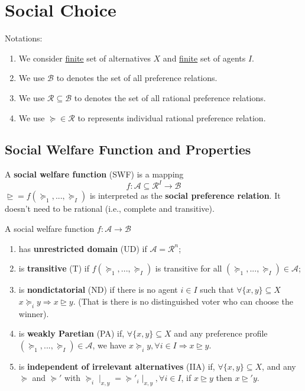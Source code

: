 \documentclass[11pt]{elegantbook}
\begin{document}
\section{Social Choice}
Notations:
\begin{enumerate}
    \item We consider \underline{finite} set of alternatives $X$ and \underline{finite} set of agents $I$.
    \item We use $\mathcal{B}$ to denotes the set of all preference relations.
    \item We use $\mathcal{R}\subseteq \mathcal{B}$ to denotes the set of all rational preference relations.
    \item We use $\succeq\in \mathcal{R}$ to represents individual rational preference relation.
\end{enumerate}

\subsection{Social Welfare Function and Properties}
\begin{definition}
    \normalfont
    A \textbf{social welfare function} (SWF) is a mapping $$f: \mathcal{A}\subseteq \mathcal{R}^I\rightarrow \mathcal{B}$$
    $\trianglerighteq=f(\succeq_1,...,\succeq_I)$ is interpreted as the \textbf{social preference relation}. It doesn't need to be rational (i.e., complete and transitive).
\end{definition}

\begin{definition}\label{SWF_properties}
    \normalfont
    A social welfare function $f: \mathcal{A}\rightarrow \mathcal{B}$
    \begin{enumerate}[$\circ$]
        \item has \textbf{unrestricted domain} (UD) if $\mathcal{A}=\mathcal{R}^n$;
        \item is \textbf{transitive} (T) if $f(\succeq_1,...,\succeq_I)$ is transitive for all $(\succeq_1,...,\succeq_I)\in \mathcal{A}$;
        \item is \textbf{nondictatorial} (ND) if there is no agent $i\in I$ such that $\forall \{x,y\}\subseteq X$ $x\succeq_i y \Rightarrow x\trianglerighteq y$. (That is there is no distinguished voter who can choose the winner).
        \item is \textbf{weakly Paretian} (PA) if, $\forall \{x,y\}\subseteq X$ and any preference profile $(\succeq_1,...,\succeq_I)\in \mathcal{A}$, we have $x\succeq_i y,\forall i\in I \Rightarrow x\trianglerighteq y$.
        \item is \textbf{independent of irrelevant alternatives} (IIA) if, $\forall \{x,y\}\subseteq X$, and any $\succeq$ and $\succeq'$ with $\succeq_i\mid_{x,y}=\succeq'_i\mid_{x,y}, \forall i\in I$, if $x\trianglerighteq y$ then $x\trianglerighteq' y$.
    \end{enumerate}
\end{definition}
\end{document}

